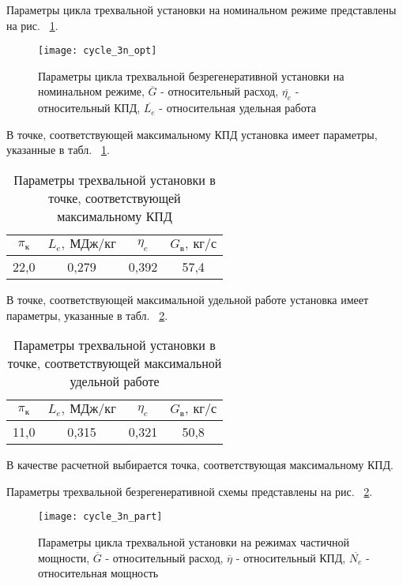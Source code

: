 Параметры цикла трехвальной установки на номинальном режиме представлены на рис. ~\ref{img:cycle_3n_opt}.

\begin{figure}[H]
    \centering
    \texttt{[image: cycle\_3n\_opt]}
    \caption{Параметры цикла трехвальной безрегенеративной установки на номинальном режиме,
	$\overline{G}$ - относительный расход, $\overline{\eta_e}$ - относительный КПД, $\overline{L_e}$ - относительная удельная работа}
    \label{img:cycle_3n_opt}
\end{figure}

В точке, соответствующей максимальному КПД установка имеет параметры, указанные в табл. ~\ref{tab:cycle_3n_max_eta}.

\begin{longtable}{|c|c|c|c|}
	\caption{Параметры трехвальной установки в точке, соответствующей максимальному КПД} 
	\label{tab:cycle_3n_max_eta}
	\hline
	\textbf{$\pi_к$} & \textbf{$L_e, \ МДж/кг$} & \textbf{$\eta_e$} & \textbf{$G_в, \ кг/с$} \\ \hline
	22,0 & 0,279 & 0,392 & 57,4 \\ \hline
\end{longtable}


В точке, соответствующей максимальной удельной работе установка имеет параметры, указанные в табл. ~\ref{tab:cycle_3n_max_labour}.
\begin{longtable}{|c|c|c|c|}
	\caption{Параметры трехвальной установки в точке, соответствующей максимальной удельной работе} 
	\label{tab:cycle_3n_max_labour}
	\hline
	\textbf{$\pi_к$} & \textbf{$L_e, \ МДж/кг$} & \textbf{$\eta_e$} & \textbf{$G_в, \ кг/с$} \\ \hline
	11,0 & 0,315 & 0,321 & 50,8 \\ \hline
\end{longtable}

В качестве расчетной выбирается точка, соответствующая максимальному КПД.

Параметры трехвальной безрегенеративной схемы представлены на рис. ~\ref{img:cycle_3n_part}.

\begin{figure}[H]
    \centering
    \texttt{[image: cycle\_3n\_part]}
    \caption{Параметры цикла трехвальной установки на режимах частичной мощности,
	$\overline{G}$ - относительный расход, $\overline{\eta}$ - относительный КПД, $\overline{N_e}$ - относительная мощность}
    \label{img:cycle_3n_part}
\end{figure}

